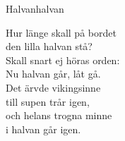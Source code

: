 \begin{song}{Halvan}{halvan}
\begin{vers}
\repopen Hur länge skall på bordet\\
den lilla halvan stå?\\
Skall snart ej höras orden:\\
Nu halvan går, låt gå. \repclose\\
\repopen Det ärvde vikingsinne\\
till supen trår igen,\\
och helans trogna minne\\
i halvan går igen. \repclose\\
\end{vers}
\end{song}
